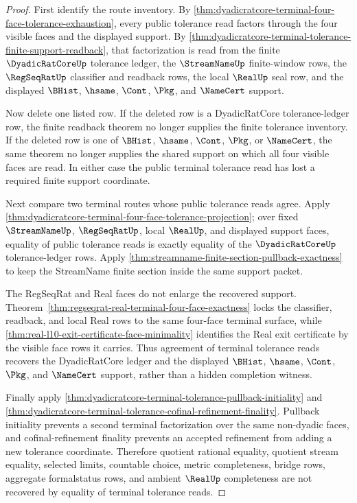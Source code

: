 \begin{proof}
First identify the route inventory. By \autoref{thm:dyadicratcore-terminal-four-face-tolerance-exhaustion}, every public tolerance read factors through the four visible faces and the displayed support. By \autoref{thm:dyadicratcore-terminal-tolerance-finite-support-readback}, that factorization is read from the finite $\DyadicRatCoreUp$ tolerance ledger, the $\StreamNameUp$ finite-window rows, the $\RegSeqRatUp$ classifier and readback rows, the local $\RealUp$ seal row, and the displayed $\BHist$, $\hsame$, $\Cont$, $\Pkg$, and $\NameCert$ support.

Now delete one listed row. If the deleted row is a DyadicRatCore tolerance-ledger row, the finite readback theorem no longer supplies the finite tolerance inventory. If the deleted row is one of $\BHist$, $\hsame$, $\Cont$, $\Pkg$, or $\NameCert$, the same theorem no longer supplies the shared support on which all four visible faces are read. In either case the public terminal tolerance read has lost a required finite support coordinate.

Next compare two terminal routes whose public tolerance reads agree. Apply \autoref{thm:dyadicratcore-terminal-four-face-tolerance-projection}; over fixed $\StreamNameUp$, $\RegSeqRatUp$, local $\RealUp$, and displayed support faces, equality of public tolerance reads is exactly equality of the $\DyadicRatCoreUp$ tolerance-ledger rows. Apply \autoref{thm:streamname-finite-section-pullback-exactness} to keep the StreamName finite section inside the same support packet.

The RegSeqRat and Real faces do not enlarge the recovered support. Theorem~\ref{thm:regseqrat-real-terminal-four-face-exactness} locks the classifier, readback, and local Real rows to the same four-face terminal surface, while \autoref{thm:real-l10-exit-certificate-face-minimality} identifies the Real exit certificate by the visible face rows it carries. Thus agreement of terminal tolerance reads recovers the DyadicRatCore ledger and the displayed $\BHist$, $\hsame$, $\Cont$, $\Pkg$, and $\NameCert$ support, rather than a hidden completion witness.

Finally apply \autoref{thm:dyadicratcore-terminal-tolerance-pullback-initiality} and \autoref{thm:dyadicratcore-terminal-tolerance-cofinal-refinement-finality}. Pullback initiality prevents a second terminal factorization over the same non-dyadic faces, and cofinal-refinement finality prevents an accepted refinement from adding a new tolerance coordinate. Therefore quotient rational equality, quotient stream equality, selected limits, countable choice, metric completeness, bridge rows, aggregate formalstatus rows, and ambient $\RealUp$ completeness are not recovered by equality of terminal tolerance reads.
\end{proof}

